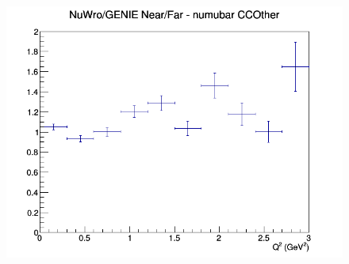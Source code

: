 \begin{figure}[h]
\endminipage
{}
\includegraphics[width=\linewidth]{eff_Q2/FGT/ratios/CCOther_NuWro_GENIE_numubar_NF_Q2.png}
\endminipage
\newline
\end{figure}
\clearpage
